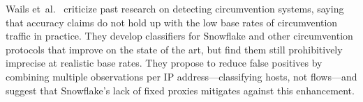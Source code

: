 \documentclass[letterpaper,twocolumn]{article}
\begin{document}
Wails et~al.~\cite{Wails2024a}
criticize past research on detecting circumvention systems,
saying that accuracy claims do not hold up
with the low base rates of circumvention traffic in practice.
They develop classifiers
for Snowflake and other circumvention protocols
that improve on the state of the art,
but find them still prohibitively imprecise at realistic base rates.
They propose to reduce false positives by combining
multiple observations per IP address---classifying hosts,
not flows---and suggest that Snowflake's lack of
fixed proxies mitigates against this enhancement.

\end{document}

